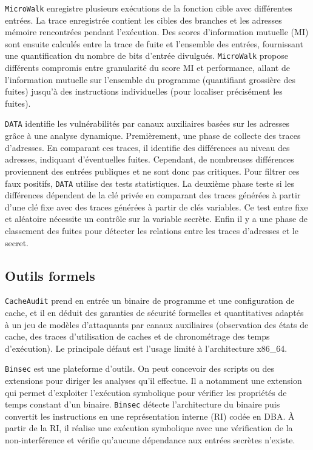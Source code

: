 \texttt{MicroWalk} enregistre plusieurs exécutions de la fonction cible avec différentes entrées. La trace enregistrée contient les cibles des branches et les adresses mémoire rencontrées pendant l’exécution. Des scores d’information mutuelle (MI) sont ensuite calculés entre la trace de fuite et l’ensemble des entrées, fournissant une quantification du nombre de bits d’entrée divulgués. \texttt{MicroWalk} propose différents compromis entre granularité du score MI et performance, allant de l’information mutuelle sur l’ensemble du programme (quantifiant grossière des fuites) jusqu’à des instructions individuelles (pour localiser précisément les fuites).\medbreak

\texttt{DATA} identifie les vulnérabilités par canaux auxiliaires basées sur les adresses grâce à une analyse dynamique. Premièrement, une phase de collecte des traces d’adresses. En comparant ces traces, il identifie des différences au niveau des adresses, indiquant d’éventuelles fuites. Cependant, de nombreuses différences proviennent des entrées publiques et ne sont donc pas critiques. Pour filtrer ces faux positifs, \texttt{DATA} utilise des tests statistiques. La deuxième phase teste si les différences dépendent de la clé privée en comparant des traces générées à partir d’une clé fixe avec des traces générées à partir de clés variables. Ce test entre fixe et aléatoire nécessite un contrôle sur la variable secrète. Enfin il y a une phase de classement des fuites pour détecter les relations entre les traces d’adresses et le secret.\medbreak


\subsection*{Outils formels}


\texttt{CacheAudit} prend en entrée un binaire de programme et une configuration de cache, et il en déduit des garanties de sécurité formelles et quantitatives adaptés à un jeu de modèles d'attaquants par canaux auxiliaires (observation des états de cache, des traces d'utilisation de caches et de chronométrage des temps d’exécution). Le principale défaut est l'usage limité à l'architecture x86\_64.\medbreak


\texttt{Binsec} est une plateforme d'outils. On peut concevoir des scripts ou des extensions pour diriger les analyses qu'il effectue. Il a notamment une extension qui permet d'exploiter l'exécution symbolique pour vérifier les propriétés de temps constant d'un binaire. \texttt{Binsec} détecte l'architecture du binaire puis convertit les instructions en une représentation interne (RI) codée en DBA. À partir de la RI, il réalise une exécution symbolique avec une vérification de la non-interférence et vérifie qu'aucune dépendance aux entrées secrètes n'existe.\medbreak

